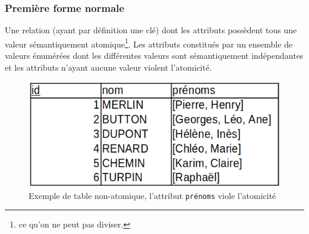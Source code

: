 \documentclass[12pt]{article}
\begin{document}
        \subsubsection{Première forme normale}
            Une relation (ayant par définition une clé) dont les attributs possèdent tous une valeur sémantiquement atomique\footnote{ce qu'on ne peut pas diviser.}. Les attributs constitués par un ensemble de valeurs énumérées dont les différentes valeurs sont sémantiquement indépendantes et les attributs n'ayant aucune valeur violent l'atomicité. 
            \begin{figure}[!h]
                \centering
                \includegraphics[scale = 0.5]{Images/Etat de l'art/non_atomique.png}
                \caption{Exemple de table non-atomique, l'attribut \texttt{prénoms} viole l'atomicité}
                \label{fig:non-atomique}
            \end{figure}
            
\end{document}
